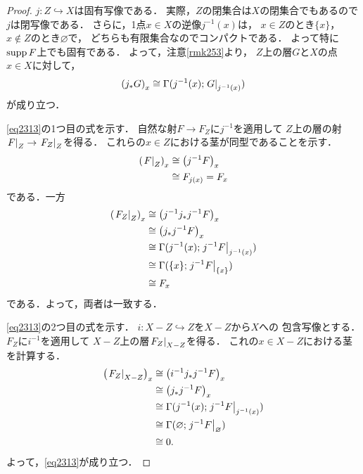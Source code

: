 \begin{proof}
    \(j\colon Z\hookrightarrow X\)は固有写像である．
    実際，\(Z\)の閉集合は\(X\)の閉集合でもあるので\(j\)は閉写像である．
    さらに，1点\(x\in X\)の逆像\(j^{-1}(x)\)は，
    \(x\in Z\)のとき\(\{x\}\)，\(x\notin Z\)のとき\(\varnothing\)で，
    どちらも有限集合なのでコンパクトである．
    よって特に\(\supp{F}\)上でも固有である．
    よって，注意\ref{rmk253}より，
    \(Z\)上の層\(G\)と\(X\)の点\(x\in X\)に対して，
    \[
        \left(j_{\ast}G\right)_x
        \cong
        \Gamma(j^{-1}(x);\mres[G]{j^{-1}(x)})
    \]
    が成り立つ．
    
    \eqref{eq2313}の1つ目の式を示す．
    自然な射\(F\to F_Z\)に\(j^{-1}\)を適用して
    \(Z\)上の層の射\(\mres[F]{Z}\to\mres[F_Z]{Z}\)を得る．
    これらの\(x\in Z\)における茎が同型であることを示す．
    \begin{align*}
        \left(\mres[F]{Z}\right)_x
        &\cong \left(j^{-1}F\right)_x\\
        &\cong F_{j(x)}=F_x
    \end{align*}
    である．一方
    \begin{align*}
        \left(\mres[F_Z]{Z}\right)_x
        &\cong \left(j^{-1}j_{\ast}j^{-1}F\right)_x\\
        &\cong \left(j_{\ast}j^{-1}F\right)_x\\
        &\cong \Gamma(j^{-1}(x);\mres[j^{-1}F]{j^{-1}(x)})\\
        &\cong \Gamma(\{x\};\mres[j^{-1}F]{\{x\}})\\
        &\cong F_x
    \end{align*}
    である．よって，両者は一致する．

    \eqref{eq2313}の2つ目の式を示す．
    \(i\colon X-Z\hookrightarrow Z\)を\(X-Z\)から\(X\)への
    包含写像とする．
    \(F_Z\)に\(i^{-1}\)を適用して
    \(X-Z\)上の層\(\mres[F_Z]{X-Z}\)を得る．
    これの\(x\in X-Z\)における茎を計算する．
    \begin{align*}
        \left(\mres[F_Z]{X-Z}\right)_x
        &\cong \left(i^{-1}j_{\ast}j^{-1}F\right)_x\\
        &\cong \left(j_{\ast}j^{-1}F\right)_x\\
        &\cong \Gamma(j^{-1}(x);\mres[j^{-1}F]{j^{-1}(x)})\\
        &\cong \Gamma(\varnothing;\mres[j^{-1}F]{\varnothing})\\
        &\cong 0.
    \end{align*}
    よって，\eqref{eq2313}が成り立つ．
\end{proof}

